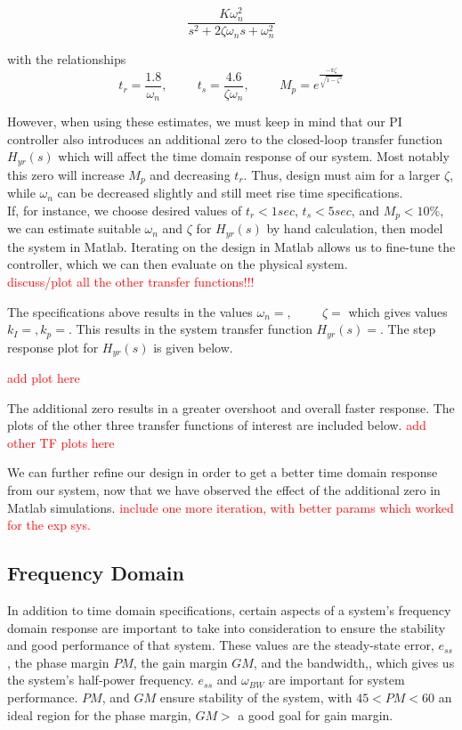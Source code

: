 \documentclass[11pt,titlepage]{article}
\begin{document}
	    \begin{equation}
	    	\frac{K\omega_n^2}{s^2+2\zeta \omega_ns+\omega_{n}^2}
	    \end{equation}
	    
	    with the relationships 
	    \begin{equation}
	    	t_r = \frac{1.8}{\omega_n}, \hspace{1cm} t_s=\frac{4.6}{\zeta\omega_n},  \hspace{1cm}  M_p=e^{\frac{-\pi \zeta}{\sqrt{1-\zeta^2}}}
	    \end{equation}
    
    	However, when using these estimates, we must keep in mind that our PI controller also introduces an additional zero to the closed-loop transfer function $H_{yr}(s)$ which will affect the time domain response of our system. Most notably this zero will increase $M_p$ and decreasing $t_r$. Thus, design must aim for a larger $\zeta$, while $\omega_n$ can be decreased slightly and still meet rise time specifications. \\
    
    	If, for instance, we choose desired values of $t_r<1 sec$, $t_s < 5 sec$, and $M_p<10\%$, we can estimate suitable $\omega_n$ and $\zeta$ for $H_{yr}(s)$ by hand calculation, then model the system in Matlab. Iterating on the design in Matlab allows us to fine-tune the controller, which we can then evaluate on the physical system.\\
	\textcolor{red}{discuss/plot all the other transfer functions!!!}
	
	The specifications above results in the values $\omega_n = , \hspace{1cm} \zeta= $ which gives values $k_I= , k_p= $. This results in the system transfer function $H_{yr}(s) = $. The step response plot for $H_{yr}(s)$ is given below.
	
	\textcolor{red}{add plot here}
	
	The additional zero results in a greater overshoot and overall faster response. The plots of the other three transfer functions of interest are included below. \textcolor{red}{add other TF plots here}
	
	We can further refine our design in order to get a better time domain response from our system, now that we have observed the effect of the additional zero in Matlab simulations. \textcolor{red}{include one more iteration, with better params which worked for the exp sys.}
	
    \subsection{Frequency Domain}
    	In addition to time domain specifications, certain aspects of a system's frequency domain response are important to take into consideration to ensure the stability and good performance of that system. These values are the steady-state error, $e_{ss}$, the phase margin $PM$, the gain margin $GM$, and the bandwidth,, which gives us the system's half-power frequency. $e_{ss}$ and  $\omega_{BW}$ are important for system performance. $PM$, and $GM$ ensure stability of the system, with $45<PM<60$ an ideal region for the phase margin, $GM>$ a good goal for gain margin. 
	
\end{document}
